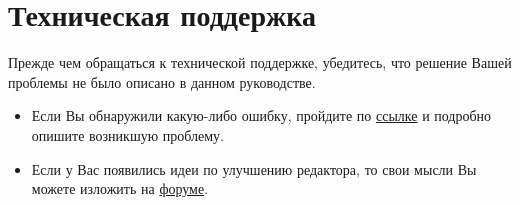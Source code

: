 \section{Техническая поддержка}

Прежде чем обращаться к технической поддержке, убедитесь, что решение Вашей проблемы не было описано в данном руководстве.

\begin{itemize}
	\item Если Вы обнаружили какую-либо ошибку, пройдите по \href{http://www.ostis.net/forum/viewtopic.php?f=8&t=283}{ссылке} и подробно опишите возникшую проблему.
	\item Если у Вас появились идеи по улучшению редактора, то свои мысли Вы можете изложить на \href{http://www.ostis.net/forum/viewtopic.php?f=8&t=86}{форуме}.
\end{itemize}
